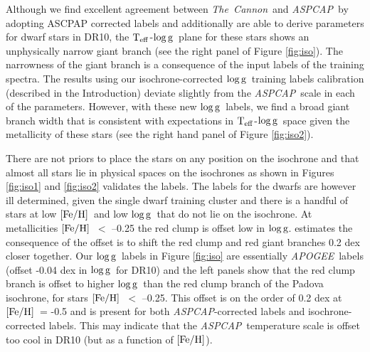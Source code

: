 \documentclass[12pt, preprint]{aastex}
\newcommand{\teff}{\mbox{$\rm T_{eff}$}}
\newcommand{\feh}{\mbox{$\rm [Fe/H]$}}
\newcommand{\logg}{\mbox{$\rm \log g$}}
\newcommand{\tc}{\textsl{The~Cannon}}
\newcommand{\apogee}{\textsl{APOGEE}}
\newcommand{\aspcap}{\textsl{ASPCAP}}
\begin{document}
Although we find excellent agreement between \tc\ and \aspcap\ by adopting ASCPAP corrected labels and additionally are able to derive parameters for dwarf stars in DR10, the \teff-\logg\ plane for these stars shows an unphysically narrow giant branch  (see the right panel of Figure \ref{fig:iso}). The narrowness of the giant branch is a consequence of the input labels of the training spectra. The results using our isochrone-corrected \logg\ training labels calibration (described in the Introduction) deviate slightly   from the \aspcap\ scale in each of the parameters. However, with these new \logg\ labels, we find a broad giant branch width that is consistent with expectations in \teff-\logg\ space given the metallicity of these stars (see the right hand panel of Figure \ref{fig:iso2}). 

There are not priors to place the stars on any position on the isochrone and that almost all stars lie in physical spaces on the isochrones as shown in Figures \ref{fig:iso1} and \ref{fig:iso2} validates the labels. The labels for the dwarfs are however ill determined, given the single dwarf training cluster and there is a handful of stars at low \feh\ and low \logg\ that do not lie on the isochrone. At metallicities \feh\ $<$ --0.25 the red clump is offset low in \logg. \citet{bovy2014} estimates the consequence of the offset is to shift the red clump and red giant branches 0.2 dex closer together. Our \logg\ labels in Figure \ref{fig:iso} are essentially \apogee\ labels (offset -0.04 dex in \logg\ for DR10) and the left panels show that the red clump branch is offset to higher \logg\ than the red clump branch of the Padova isochrone, for stars \feh\ $<$ --0.25. This offset is on the order of 0.2 dex at \feh\ = -0.5 and is present for both \aspcap-corrected  labels and isochrone-corrected labels. This may indicate that the \aspcap\ temperature scale is offset too cool in DR10 (but as a function of \feh).

\end{document}
